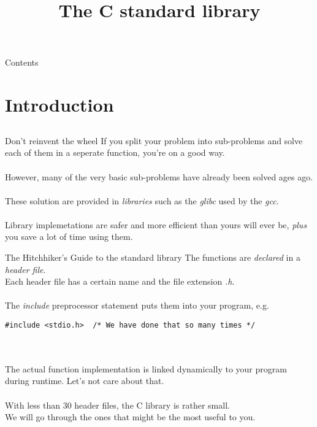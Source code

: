 
\newcommand{\topic}{
	The C standard library
}

\title{\topic}
\supertitle{\course}
\date{}



\maketitle

\begin{frame}{Contents}
	\tableofcontents
\end{frame}

\section{Introduction}
\subsection{}
\begin{frame}{Don't reinvent the wheel}
	If you split your problem into sub-problems and solve each of them in a seperate function, you're on a good way. \\ \ \\
	However, many of the very basic sub-problems have already been solved ages ago. \\ \ \\
	These solution are provided in \textit{libraries} such as the \textit{glibc} used by the \textit{gcc}. \\ \ \\
	Library implemetations are safer and more efficient than yours will ever be, \textit{plus} you save a lot of time using them.
\end{frame}
\begin{frame}[fragile]{The Hitchhiker's Guide to the standard library}
	The functions are \textit{declared} in a \textit{header file}. \\
	Each header file has a certain name and the file extension \textit{.h}. \\ \ \\
	The \textit{include} preprocessor statement puts them into your program, e.g.
\begin{lstlisting}[numbers=none]
#include <stdio.h>	/* We have done that so many times */
\end{lstlisting} \ \\ \ \\
	The actual function implementation is linked dynamically to your program during runtime. Let's not care about that. \\ \ \\
	With less than 30 header files, the C library is rather small. \\
	We will go through the ones that might be the most useful to you.
\end{frame}
